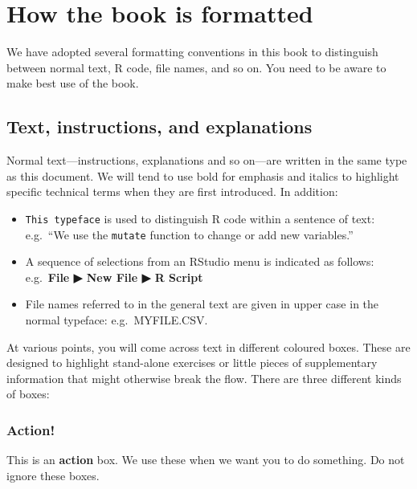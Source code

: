 \documentclass[
]{book}
\providecommand{\tightlist}{%
  \setlength{\itemsep}{0pt}\setlength{\parskip}{0pt}}
\newenvironment{greybox}{
  \definecolor{shadecolor}{rgb}{0.95,0.95,0.95}  %
  \color{black}
  \begin{shaded}}
 {\end{shaded}}
\newenvironment{infobox}[1]
  {
  \begin{itemize}
  \renewcommand{\labelitemi}{
    \raisebox{-.7\height}[0pt][0pt]{
      {\setkeys{Gin}{width=3em,keepaspectratio}
        \texttt{[image: images/\#1]}}
    }
  }
  \setlength{\fboxsep}{1em}
  \begin{greybox}
  \item
  }
  {
  \end{greybox}
  \end{itemize}
  }
\begin{document}
\hypertarget{how-the-book-is-formatted}{%
\section*{How the book is formatted}\label{how-the-book-is-formatted}}

We have adopted several formatting conventions in this book to distinguish between normal text, R code, file names, and so on. You need to be aware to make best use of the book.

\hypertarget{text-instructions-and-explanations}{%
\subsection*{Text, instructions, and explanations}\label{text-instructions-and-explanations}}

Normal text---instructions, explanations and so on---are written in the same type as this document. We will tend to use bold for emphasis and italics to highlight specific technical terms when they are first introduced. In addition:

\begin{itemize}
\tightlist
\item
  \texttt{This\ typeface} is used to distinguish R code within a sentence of text: e.g.~``We use the \texttt{mutate} function to change or add new variables.''
\item
  A sequence of selections from an RStudio menu is indicated as follows: e.g.~\textbf{File ▶ New File ▶ R Script}
\item
  File names referred to in the general text are given in upper case in the normal typeface: e.g.~MYFILE.CSV.
\end{itemize}

At various points, you will come across text in different coloured boxes. These are designed to highlight stand-alone exercises or little pieces of supplementary information that might otherwise break the flow. There are three different kinds of boxes:

\begin{infobox}{action}

\hypertarget{action}{%
\subsubsection*{Action!}\label{action}}

This is an \textbf{action} box. We use these when we want you to do something. Do not ignore these boxes.

\end{infobox}
\end{document}
